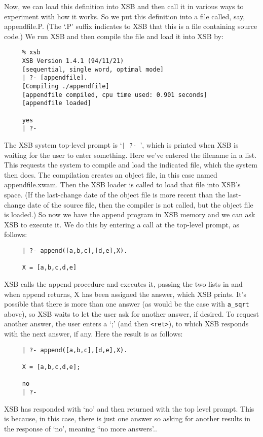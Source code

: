 Now, we can load this definition into XSB and then call it in various
ways to experiment with how it works.  So we put this definition into
a file called, say, appendfile.P.  (The `.P' suffix indicates to XSB
that this is a file containing source code.)  We run XSB and then
compile the file and load it into XSB by:
\begin{verbatim}
     % xsb
     XSB Version 1.4.1 (94/11/21)
     [sequential, single word, optimal mode]
     | ?- [appendfile].
     [Compiling ./appendfile]
     [appendfile compiled, cpu time used: 0.901 seconds]
     [appendfile loaded]

     yes
     | ?- 
\end{verbatim}
The XSB system top-level prompt is `\verb^| ?- ^', which is printed
when XSB is waiting for the user to enter something.  Here we've
entered the filename in a list.  This requests the system to compile
and load the indicated file, which the system then does.  The
compilation creates an object file, in this case named appendfile.xwam.
Then the XSB loader is called to load that file into XSB's space.  (If
the last-change date of the object file is more recent than the
last-change date of the source file, then the compiler is not called,
but the object file is loaded.)  So now we have the append program in
XSB memory and we can ask XSB to execute it.  We do this by entering a
call at the top-level prompt, as follows:
\begin{verbatim}
     | ?- append([a,b,c],[d,e],X).

     X = [a,b,c,d,e]
\end{verbatim}
XSB calls the append procedure and executes it, passing the two lists
in and when append returns, X has been assigned the answer, which XSB
prints.  It's possible that there is more than one answer (as would be
the case with \verb|a_sqrt| above), so XSB waits to let the user ask
for another answer, if desired.  To request another answer, the user
enters a `;' (and then \verb|<ret>|), to which XSB responds with the next answer, if any.
Here the result is as follows:
\begin{verbatim}
     | ?- append([a,b,c],[d,e],X).

     X = [a,b,c,d,e];

     no
     | ?- 
\end{verbatim}
XSB has responded with `no' and then returned with the top level
prompt.  This is because, in this case, there is just one answer so
asking for another results in the response of `no', meaning ``no more answers'..

